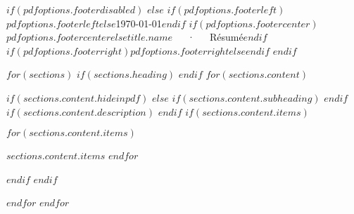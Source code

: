 \documentclass[$if(pdfoptions.fontsize)$$pdfoptions.fontsize$$else$10pt$endif$, a4paper]{puredoc-cv}
\begin{document}

$if(pdfoptions.footerdisabled)$
$else$
\makecvfooter
  {$if(pdfoptions.footerleft)$$pdfoptions.footerleft$$else$\today$endif$}
  {$if(pdfoptions.footercenter)$$pdfoptions.footercenter$$else$$title.name$~~~·~~~Résumé$endif$}
  {$if(pdfoptions.footerright)$$pdfoptions.footerright$$else$\thepage$endif$}
$endif$

$for(sections)$
$if(sections.heading)$
$endif$
$for(sections.content)$
\begin{skipwrapper}
$if(sections.content.hideinpdf)$
$else$
$if(sections.content.subheading)$
$endif$
$if(sections.content.description)$
$endif$
$if(sections.content.items)$
  \begin{cvitems}
$for(sections.content.items)$
    \item {$sections.content.items$}
$endfor$
  \end{cvitems}
$endif$
$endif$
\end{skipwrapper}
$endfor$
$endfor$
\end{document}
